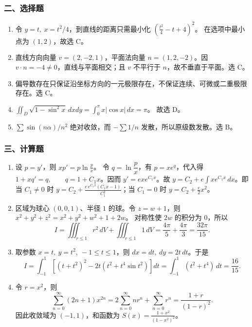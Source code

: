 \subsubsection*{二、选择题}
\begin{enumerate}
  \item 令 $y=t,\ x=t^2/4$，到直线的距离只需最小化 \(\displaystyle \left(\frac{t^2}{4}-t+4\right)^2\)。
  在选项中最小点为 $(1,2)$，故选 C。
  \item 直线方向向量 $v=(2,-2,1)$，平面法向量 $n=(1,2,-2)$。因 $v\cdot n=-4\ne0$，直线与平面相交；且 $v$ 不平行于 $n$，故不垂直于平面。选 C。
  \item 偏导数存在只保证沿坐标方向的一元极限存在，不保证连续、可微或二重极限存在。选 C。
  \item \(\displaystyle \iint_D\sqrt{1-\sin^2x}\,dxdy
  =\int_0^\pi x|\cos x|\,dx=\pi\)。
  故选 D。
  \item $\sum\sin(n\alpha)/n^2$ 绝对收敛，而 $-\sum1/n$ 发散，所以原级数发散。选 B。
\end{enumerate}

\subsubsection*{三、计算题}
\begin{enumerate}
  \item 设 $p=y'$，则 \(\displaystyle xp'=p\ln\frac{p}{x}\)。
  令 $q=\ln\dfrac{p}{x}$，有 $p=xe^q$，代入得
  \(\displaystyle 1+xq'=q,\qquad q=1+C_1x\)。因而 $y'=ex e^{C_1x}$。故
  \(\displaystyle y=C_2+e\int x e^{C_1x}\,dx\)。即当 $C_1\ne0$ 时
  \(\displaystyle y=C_2+\frac{e\,e^{C_1x}(C_1x-1)}{C_1^2}\)；当 $C_1=0$ 时
  \(\displaystyle y=C_2+\frac e2x^2\)。
  \item 区域为球心 $(0,0,1)$、半径 $1$ 的球。令 $z=w+1$，则
  \(\displaystyle x^2+y^2+z^2=x^2+y^2+w^2+1+2w\)。
  对称性使 $2w$ 的积分为 $0$，所以
  \[
  I=\iiint_{r\le1}r^2\,dV+\iiint_{r\le1}1\,dV
  =\frac{4\pi}{5}+\frac{4\pi}{3}
  =\frac{32\pi}{15}.
  \]
  \item 取参数 $x=t,\ y=t^2,\ -1\le t\le1$，则 $dx=dt,\ dy=2t\,dt$。于是
  \[
  I=\int_{-1}^{1}\left[(t+t^2)^2-2t(t^2+t^4\sin t^2)\right]dt
  =\int_{-1}^{1}(t^2+t^4)\,dt=\frac{16}{15}.
  \]
  \item 令 $r=x^2$，则
  \[
  \sum_{n=0}^{\infty}(2n+1)x^{2n}
  =2\sum_{n=0}^{\infty}nr^n+\sum_{n=0}^{\infty}r^n
  =\frac{1+r}{(1-r)^2}.
  \]
  因此收敛域为 $(-1,1)$，和函数为
  \(\displaystyle S(x)=\frac{1+x^2}{(1-x^2)^2}\)。
\end{enumerate}

